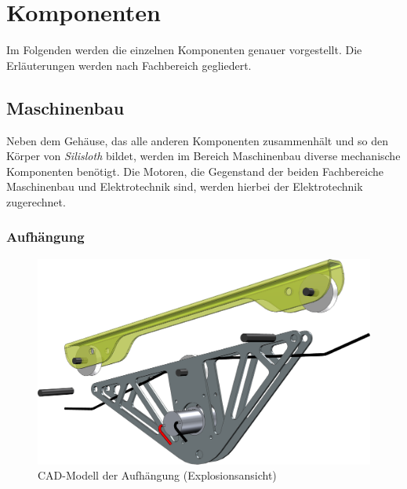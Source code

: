 \section{Komponenten}

Im Folgenden werden die einzelnen Komponenten genauer vorgestellt. Die Erläuterungen werden nach Fachbereich gegliedert.

\subsection{Maschinenbau}
\label{sec:komponenten-maschinenbau}

Neben dem Gehäuse, das alle anderen Komponenten zusammenhält und so den Körper von \textit{Silisloth} bildet, werden im Bereich Maschinenbau diverse mechanische Komponenten benötigt. Die Motoren, die Gegenstand der beiden Fachbereiche Maschinenbau und Elektrotechnik sind, werden hierbei der Elektrotechnik zugerechnet.

\subsubsection{Aufhängung}

\begin{figure}
    \centering
    \includegraphics[width=\linewidth]{pics/aufhaengung.png}
    \caption{CAD-Modell der Aufhängung (Explosionsansicht)}
    \label{fig:aufhaengung}
\end{figure}

